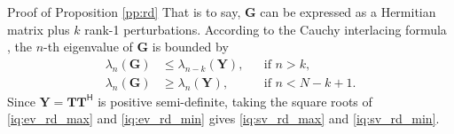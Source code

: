 \documentclass[journal]{IEEEtran}
\begin{document}
\begin{appendix}
\begin{subsection}{Proof of Proposition \ref{pp:rd}}
		That is to say, $\mathbf{G}$ can be expressed as a Hermitian matrix plus $k$ rank-1 perturbations.
		According to the Cauchy interlacing formula \cite[Theorem 8.4.3]{Golub2013}, the $n$-th eigenvalue of $\mathbf{G}$ is bounded by
		\begin{align}
			\lambda_n(\mathbf{G}) & \le \lambda_{n-k}(\mathbf{Y}), &  & \text{if } n > k, \label{iq:ev_rd_max}          \\
			\lambda_n(\mathbf{G}) & \ge \lambda_n(\mathbf{Y}),     &  & \text{if } n < N - k + 1 \label{iq:ev_rd_min}.
		\end{align}
		Since $\mathbf{Y} = \mathbf{T} \mathbf{T}^\mathsf{H}$ is positive semi-definite, taking the square roots of \eqref{iq:ev_rd_max} and \eqref{iq:ev_rd_min} gives \eqref{iq:sv_rd_max} and \eqref{iq:sv_rd_min}.
	\end{subsection}


\end{appendix}
\end{document}
